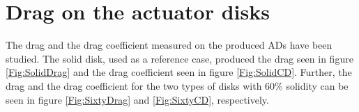 \section{Drag on the actuator disks}

The drag and the drag coefficient measured on the produced \gls{AD}s have been studied. The solid disk, used as a reference case, produced the drag seen in figure \ref{Fig:SolidDrag} and the drag coefficient seen in figure \ref{Fig:SolidCD}. Further, the drag and the drag coefficient for the two types of disks with 60\% solidity can be seen in figure \ref{Fig:SixtyDrag} and \ref{Fig:SixtyCD}, respectively. 



